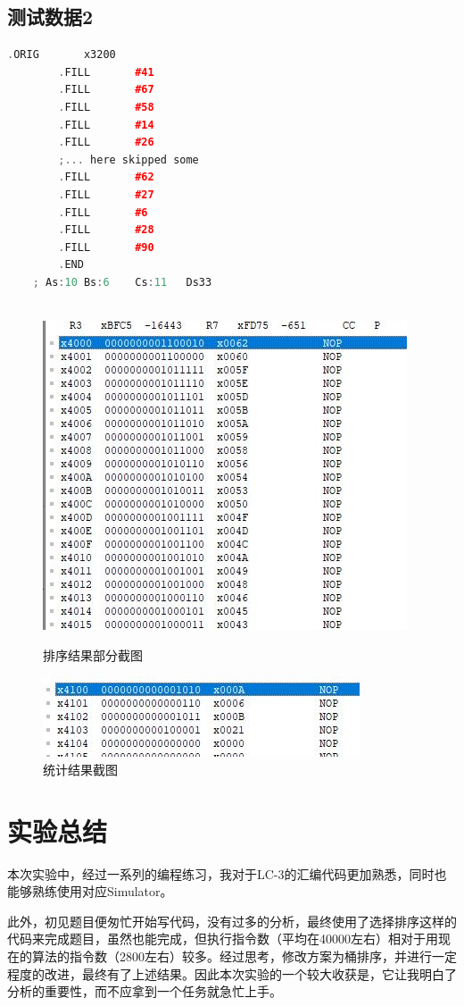 \documentclass[UTF8]{article}
\begin{document}
	\subsection{测试数据2}
	\begin{lstlisting}[language=C++]
		.ORIG		x3200
		.FILL		#41
		.FILL		#67
		.FILL		#58
		.FILL		#14
		.FILL		#26
		;... here skipped some
		.FILL		#62
		.FILL		#27
		.FILL		#6
		.FILL		#28
		.FILL		#90
		.END
	; As:10	Bs:6	Cs:11	Ds33
	
	\end{lstlisting}
	
	\begin{figure}[H]
		\begin{minipage}[H]{0.48\linewidth}
			\centering
			\includegraphics[scale=0.45]{2_1.jpg}
			\caption{排序结果部分截图}
			\label{2_1}
		\end{minipage}
		\begin{minipage}[H]{0.48\linewidth}
			\centering
			\includegraphics[scale=0.4]{2_2.jpg}
			\caption{统计结果截图}
			\label{2_2}
		\end{minipage}
	\end{figure}

	\section{实验总结}
	本次实验中，经过一系列的编程练习，我对于LC-3的汇编代码更加熟悉，同时也能够熟练使用对应Simulator。\par
	此外，初见题目便匆忙开始写代码，没有过多的分析，最终使用了选择排序这样的代码来完成题目，虽然也能完成，但执行指令数（平均在40000左右）相对于用现在的算法的指令数（2800左右）较多。经过思考，修改方案为桶排序，并进行一定程度的改进，最终有了上述结果。因此本次实验的一个较大收获是，它让我明白了分析的重要性，而不应拿到一个任务就急忙上手。\par
	
\end{document}
